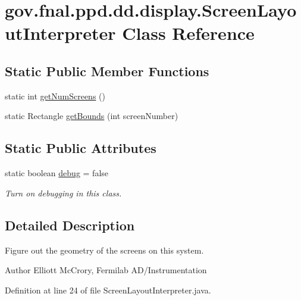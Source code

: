 \hypertarget{classgov_1_1fnal_1_1ppd_1_1dd_1_1display_1_1ScreenLayoutInterpreter}{\section{gov.\-fnal.\-ppd.\-dd.\-display.\-Screen\-Layout\-Interpreter Class Reference}
\label{classgov_1_1fnal_1_1ppd_1_1dd_1_1display_1_1ScreenLayoutInterpreter}
}
\subsection*{Static Public Member Functions}
\begin{DoxyCompactItemize}
\item 
static int \hyperlink{classgov_1_1fnal_1_1ppd_1_1dd_1_1display_1_1ScreenLayoutInterpreter_a28bf32f519c6365ebf15a0d8d539595f}{get\-Num\-Screens} ()
\item 
static Rectangle \hyperlink{classgov_1_1fnal_1_1ppd_1_1dd_1_1display_1_1ScreenLayoutInterpreter_a1202af9585c07cffdc214d0674d30e35}{get\-Bounds} (int screen\-Number)
\end{DoxyCompactItemize}
\subsection*{Static Public Attributes}
\begin{DoxyCompactItemize}
\item 
static boolean \hyperlink{classgov_1_1fnal_1_1ppd_1_1dd_1_1display_1_1ScreenLayoutInterpreter_aa00d08475435546dab252b31c72e982d}{debug} = false
\begin{DoxyCompactList}\small\item\em Turn on debugging in this class. \end{DoxyCompactList}\end{DoxyCompactItemize}


\subsection{Detailed Description}
Figure out the geometry of the screens on this system.

\begin{DoxyAuthor}{Author}
Elliott Mc\-Crory, Fermilab A\-D/\-Instrumentation 
\end{DoxyAuthor}


Definition at line 24 of file Screen\-Layout\-Interpreter.\-java.




